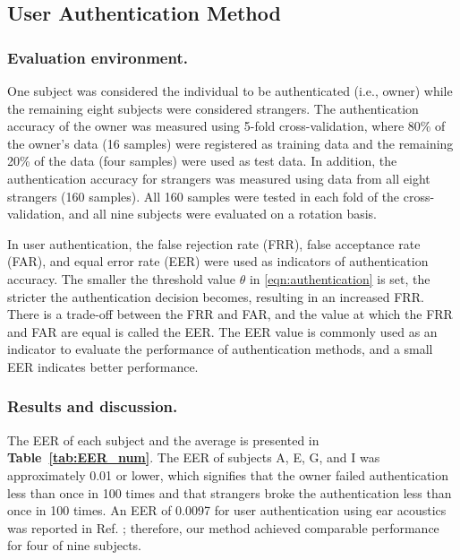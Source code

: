\documentclass[sigconf,authordraft]{acmart}
\newcommand\figref[1]{\textbf{Figure~\ref{fig:#1}}}
\newcommand\tabref[1]{\textbf{Table~\ref{tab:#1}}}
\begin{document}
\subsection{User Authentication Method}
\subsubsection{Evaluation environment.}
One subject was considered the individual to be authenticated (i.e., owner) while the remaining eight subjects were considered strangers. The authentication accuracy of the owner was measured using 5-fold cross-validation, where 80\% of the owner's data (16 samples) were registered as training data and the remaining 20\% of the data (four samples) were used as test data. In addition, the authentication accuracy for strangers was measured using data from all eight strangers (160 samples). All 160 samples were tested in each fold of the cross-validation, and all nine subjects were evaluated on a rotation basis.\par

In user authentication, the false rejection rate (FRR), false acceptance rate (FAR), and equal error rate (EER) were used as indicators of authentication accuracy.
The smaller the threshold value $\theta$ in \ref{eqn:authentication} is set, the stricter the authentication decision becomes, resulting in an increased FRR.
There is a trade-off between the FRR and FAR, and the value at which the FRR and FAR are equal is called the EER. The EER value is commonly used as an indicator to evaluate the performance of authentication methods, and a small EER indicates better performance.


\subsubsection{Results and discussion.}
The EER of each subject and the average is presented in \tabref{EER_num}.
The EER of subjects A, E, G, and I was approximately 0.01 or lower, which signifies that the owner failed authentication less than once in 100 times and that strangers broke the authentication less than once in 100 times. An EER of 0.0097 for user authentication using ear acoustics was reported in Ref. \cite{ear_auth}; therefore, our method achieved comparable performance for four of nine subjects.\par
\end{document}
